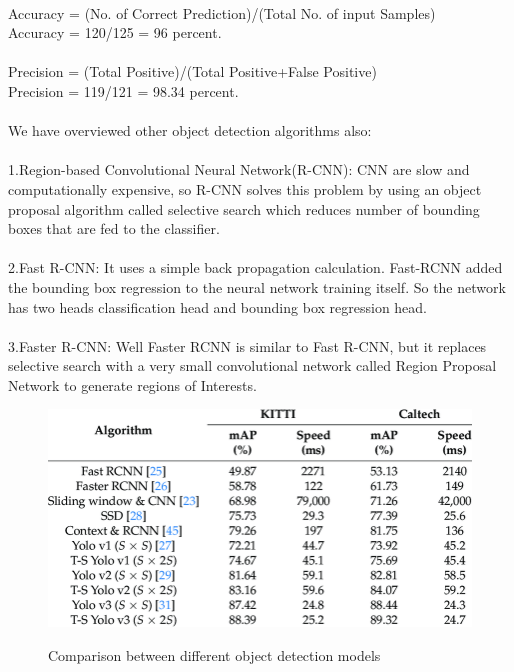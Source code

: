 \documentclass[12pt]{article}
\begin{document}
\\
Accuracy = (No. of Correct Prediction)/(Total No. of input Samples)\\
Accuracy = 120/125 = 96 percent.\\
\\
Precision = (Total Positive)/(Total Positive+False Positive)\\
Precision = 119/121 = 98.34 percent.\\
\\
We have overviewed other  object detection algorithms also:\\
\\
1.Region-based Convolutional Neural Network(R-CNN): CNN are slow and computationally expensive, so R-CNN solves this problem by using an object proposal algorithm called selective search which reduces number of bounding boxes that are fed to the classifier.\cite{4}\\
\\
2.Fast R-CNN: It uses a simple back propagation calculation. Fast-RCNN added the bounding box regression to the neural network training itself. So the network has two heads classification head and bounding box regression head.\cite{4}\\
\\
3.Faster R-CNN: Well Faster RCNN is similar to Fast R-CNN, but it replaces selective search with a very small convolutional  network called Region Proposal Network to generate regions of Interests.\cite{4}
\begin{figure}[h]
\centering
\includegraphics[scale=0.4]{Comparison.PNG}
\caption{Comparison between different object detection models}
\label{Comparison.PNG}
\cite{6}
\end{figure}
\end{document}
